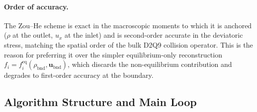 \paragraph{Order of accuracy.}
The Zou--He scheme is exact in the macroscopic moments to which it is anchored ($\rho$ at the outlet, $u_x$ at the inlet) and is second-order accurate in the deviatoric stress, matching the spatial order of the bulk D2Q9 collision operator.
This is the reason for preferring it over the simpler equilibrium-only reconstruction $f_i = f_i^{\mathrm{eq}}(\rho_{\mathrm{bnd}}, \bm{u}_{\mathrm{bnd}})$, which discards the non-equilibrium contribution and degrades to first-order accuracy at the boundary.

\subsection{Algorithm Structure and Main Loop}

